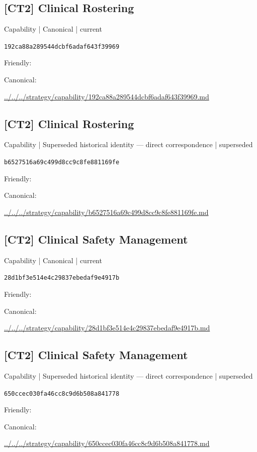 \documentclass[10pt,a4paper]{article}
\begin{document}
\subsection*{[CT2] Clinical Rostering}
{\small Capability | Canonical | current}\par
\texttt{192ca88a289544dcbf6adaf643f39969}\par
Friendly: \par
Canonical: \par
{\footnotesize\url{../../../strategy/capability/192ca88a289544dcbf6adaf643f39969.md}}\par
\subsection*{[CT2] Clinical Rostering}
{\small Capability | Superseded historical identity — direct correspondence | superseded}\par
\texttt{b6527516a69c499d8cc9c8fe881169fe}\par
Friendly: \par
Canonical: \par
{\footnotesize\url{../../../strategy/capability/b6527516a69c499d8cc9c8fe881169fe.md}}\par
\subsection*{[CT2] Clinical Safety Management}
{\small Capability | Canonical | current}\par
\texttt{28d1bf3e514e4c29837ebedaf9e4917b}\par
Friendly: \par
Canonical: \par
{\footnotesize\url{../../../strategy/capability/28d1bf3e514e4c29837ebedaf9e4917b.md}}\par
\subsection*{[CT2] Clinical Safety Management}
{\small Capability | Superseded historical identity — direct correspondence | superseded}\par
\texttt{650ccec030fa46cc8c9d6b508a841778}\par
Friendly: \par
Canonical: \par
{\footnotesize\url{../../../strategy/capability/650ccec030fa46cc8c9d6b508a841778.md}}\par
\end{document}
